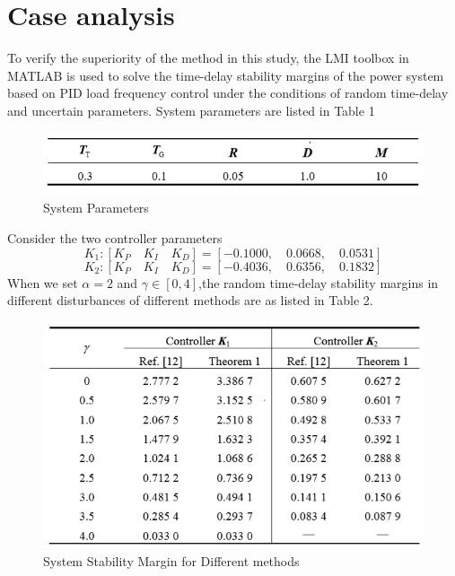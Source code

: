 \documentclass[journal]{IEEEtran}
\begin{document}
\section{Case analysis}
To verify the superiority of the method in this study, the LMI toolbox in MATLAB is used to solve the time-delay stability margins of the power system based on PID load frequency control under the conditions of random time-delay and uncertain parameters. System parameters are listed in Table 1
\begin{figure}[h!]
\includegraphics[width=\linewidth]{systemparameters.png}
  \caption{System Parameters}
  \label{Table1: System Parameters}
\end{figure}
Consider the two controller parameters \\
\begin{equation}
K_1 : [K_P \quad K_I \quad K_D]  = [-0.100 0,\quad 0.066 8, \quad 0.053 1]
\end{equation}
\begin{equation}
K_2 : [K_P \quad K_I \quad K_D]  = [-0.403 6,\quad 0.635 6, \quad 0.183 2]
\end{equation}
When we set $\alpha =2 $ and $\gamma \in [0,4]$,the random time-delay stability margins in different disturbances of different methods are as listed in Table 2. 
\begin{figure}[h!]
\includegraphics[width=\linewidth]{stabilitymargin.png}
  \caption{System Stability Margin for Different methods}
  \label{Table2: System Stability margin for different methods}
\end{figure}
\end{document}
